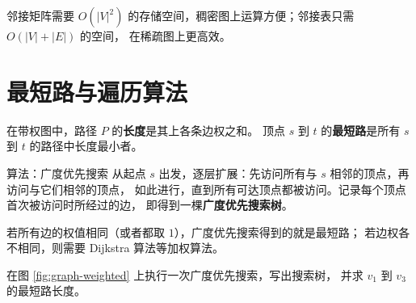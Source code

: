 邻接矩阵需要 $O(|V|^2)$ 的存储空间，稠密图上运算方便；邻接表只需 $O(|V| + |E|)$ 的空间，
在稀疏图上更高效。

\section{最短路与遍历算法}

\begin{definition}[最短路]
在带权图中，路径 $P$ 的\textbf{长度}是其上各条边权之和。
顶点 $s$ 到 $t$ 的\textbf{最短路}是所有 $s$ 到 $t$ 的路径中长度最小者。
\end{definition}

\begin{custom}{算法：广度优先搜索}
从起点 $s$ 出发，逐层扩展：先访问所有与 $s$ 相邻的顶点，再访问与它们相邻的顶点，
如此进行，直到所有可达顶点都被访问。记录每个顶点首次被访问时所经过的边，
即得到一棵\textbf{广度优先搜索树}。
\end{custom}

\begin{note}
若所有边的权值相同（或者都取 $1$），广度优先搜索得到的就是最短路；
若边权各不相同，则需要 Dijkstra 算法等加权算法。
\end{note}

\begin{exercise}
在图 \ref{fig:graph-weighted} 上执行一次广度优先搜索，写出搜索树，
并求 $v_1$ 到 $v_3$ 的最短路长度。
\end{exercise}
